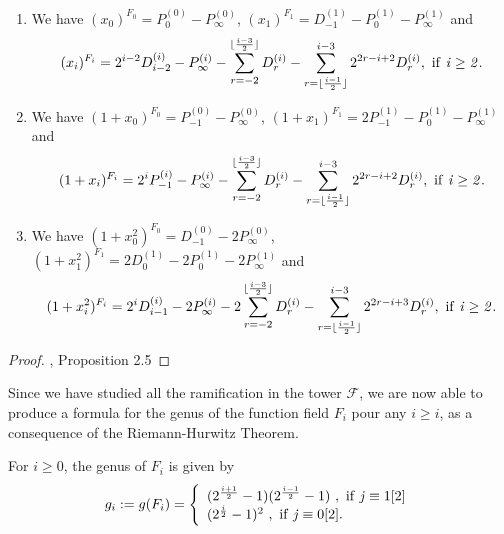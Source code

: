 \documentclass[10pt]{article}
\begin{document}
\begin{proposition} \label{div principaux}
\begin{enumerate}
\item We have $(x_0)^{F_0} = P_0^{(0)} - P_{\infty}^{(0)}$, $(x_1)^{F_1} = D_{-1}^{(1)} - P_0^{(1)} - P_{\infty}^{(1)}$ and 
\begin{equation*}
(x_i)^{F_i} = 2^{i-2}D_{i-2}^{(i)} - P_{\infty}^{(i)} - \sum\limits_{r=-2}^{\lfloor \frac{i-3}{2}\rfloor} D_r^{(i)} - \sum\limits_{r=\lfloor \frac{i-1}{2}\rfloor}^{i-3} 2^{2r-i+2}D_r^{(i)}, \ \rm if \it \ i\geq 2.
\end{equation*}
\item We have $(1+x_0)^{F_0} = P_{-1}^{(0)} - P_{\infty}^{(0)}$, $(1+x_1)^{F_1} = 2P_{-1}^{(1)} - P_0^{(1)} - P_{\infty}^{(1)}$ and 
\begin{equation*}
(1+x_i)^{F_i} = 2^{i}P_{-1}^{(i)} - P_{\infty}^{(i)} - \sum\limits_{r=-2}^{\lfloor \frac{i-3}{2}\rfloor} D_r^{(i)} - \sum\limits_{r=\lfloor \frac{i-1}{2}\rfloor}^{i-3} 2^{2r-i+2}D_r^{(i)}, \ \rm if \it \ i\geq 2.
\end{equation*}
\item We have $(1+x_0^2)^{F_0} =  D_{-1}^{(0)} - 2P_{\infty}^{(0)}$, $(1+x_1^2)^{F_1} = 2D_{0}^{(1)} - 2P_0^{(1)} - 2P_{\infty}^{(1)}$ and 
\begin{equation*}
(1+x_i^2)^{F_i} = 2^{i}D_{i-1}^{(i)} - 2P_{\infty}^{(i)} - 2\sum\limits_{r=-2}^{\lfloor \frac{i-3}{2}\rfloor} D_r^{(i)} - \sum\limits_{r=\lfloor \frac{i-1}{2}\rfloor}^{i-3} 2^{2r-i+3}D_r^{(i)}, \ \rm if \it \ i\geq 2.
\end{equation*}
\end{enumerate}
\end{proposition}

\s

\begin{proof}
\cite{NOQ}, Proposition 2.5
\end{proof}

\s

Since we have studied all the ramification in the tower $\mathcal{F}$, we are now able to produce a formula for the genus of the function field $F_i$ pour any $i \geq i$, as a consequence of the Riemann-Hurwitz Theorem.

\s

\begin{proposition}
For $i \geq 0$, the genus of $F_i$ is given by 
\begin{equation*}
g_i := g(F_i) = \left\{ \begin{array}{ll}
(2^{\frac{i+1}{2}}-1)(2^{\frac{i-1}{2}}-1) \ , \ \rm if \ \it j \equiv \rm 1[2] \\
(2^{\frac{i}{2}}-1)^2 \ , \ \rm if \ \it j \equiv \rm 0[2].
\end{array}
\right.
\end{equation*}
\end{proposition}
\end{document}
